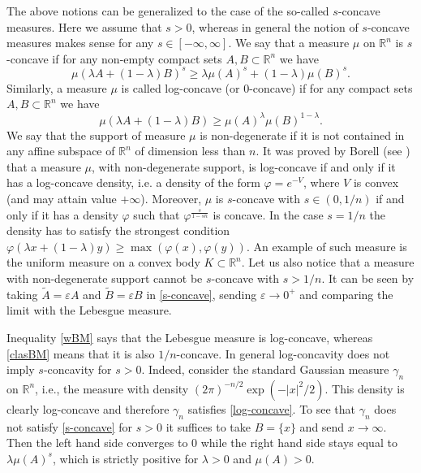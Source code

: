 \documentclass[11pt]{article}
\newcommand{\mb}[1]{\mathbb{{#1}}}
\newcommand{\1}{\mathbf{{1}}}
\newcommand{\e}{\varepsilon}
\newcommand{\vp}{\varphi}
\theoremstyle{definition}
\begin{document}
The above notions can be generalized to the case of the so-called $s$-concave measures. Here we assume that $s > 0$, whereas in general the notion of $s$-concave measures makes sense for any $s\in[-\infty,\infty]$. We say that a measure $\mu$ on $\mb{R}^n$ is $s$-concave if for any non-empty compact sets $A,B \subset \mb{R}^n$ we have
\begin{equation}\label{s-concave}
\mu(\lambda A+(1-\lambda)B)^s \geq \lambda \mu(A)^s +(1-\lambda) \mu(B)^s.
\end{equation}
Similarly, a measure $\mu$ is called log-concave (or $0$-concave) if for any compact sets $A,B \subset \mb{R}^n$ we have
\begin{equation}\label{log-concave}
\mu(\lambda A+(1-\lambda)B) \geq  \mu(A)^\lambda  \mu(B)^{1-\lambda}.
\end{equation}
We say that the support of measure  $\mu$ is non-degenerate  if it is not contained in any affine subspace of $\mb{R}^n$ of dimension less than $n$. It was proved by Borell (see  \cite{B}) that a measure $\mu$, with non-degenerate support, is log-concave if and only if it has a log-concave density, i.e. a density  of the form $\vp=e^{-V}$, where $V$ is convex (and may attain value $+\infty$).  Moreover, $\mu$ is $s$-concave with $s \in (0,1/n)$ if and only if it has a density $\vp$  such that $\vp^{\frac{s}{1-sn}}$ is concave. In the case $s=1/n$ the density has to satisfy the strongest condition $\vp(\lambda x+(1-\lambda)y) \geq \max(\vp(x),\vp(y))$. An example of such measure is the uniform measure on a convex body $K \subset \mb{R}^n$. Let us also notice that a measure with non-degenerate support cannot be $s$-concave with $s>1/n$. It can be seen by taking $\tilde{A}=\e A$ and $\tilde{B}=\e B$ in \eqref{s-concave}, sending $\e \to 0^+$ and comparing the limit with the Lebesgue measure.

Inequality \eqref{wBM} says that the Lebesgue measure is log-concave, whereas \eqref{clasBM} means that it is also $1/n$-concave. In general log-concavity does not imply $s$-concavity for $s>0$.  Indeed, consider the standard Gaussian measure $\gamma_n$ on $\mb{R}^n$, i.e., the measure with density $(2\pi)^{-n/2}\exp(-|x|^2/2)$. This density is clearly log-concave and therefore $\gamma_n$ satisfies \eqref{log-concave}. To see that $\gamma_n$ does not satisfy \eqref{s-concave} for $s>0$ it suffices to take $B=\{x\}$ and send $x \to \infty$. Then the left hand side converges to $0$ while the right hand side stays equal to $\lambda \mu(A)^s$, which is strictly positive for $\lambda > 0$ and $\mu(A)>0$.
\end{document}

